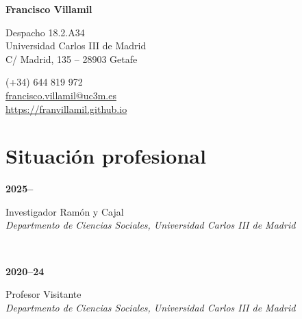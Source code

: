 \documentclass[a4paper, 12pt]{article}
\begin{document}

\begin{center}
{\bfseries\Large Francisco Villamil}
\end{center}

\vspace{0pt}

\noindent
\begin{minipage}[t]{0.47\textwidth}\small
\flushright
	Despacho 18.2.A34\\
	Universidad Carlos III de Madrid\\
	C/ Madrid, 135 -- 28903 Getafe\\
\end{minipage}\hfill
\begin{minipage}[t]{0.47\textwidth}\small
	 \hspace{5pt} (+34) 644 819 972\\
	 \hspace{5pt} \href{mailto:francisco.villamil@uc3m.es}{francisco.villamil@uc3m.es}\\
	 \hspace{5pt} \href{https://franvillamil.github.io}{https://franvillamil.github.io}\\
\end{minipage}


\section*{Situación profesional}

\noindent
\begin{minipage}[t]{0.12\textwidth}
\textbf{2025--}
\end{minipage}\hfill\begin{minipage}[t]{0.88\textwidth}
Investigador Ramón y Cajal\\
\textit{Departmento de Ciencias Sociales, Universidad Carlos III de Madrid}\\\vspace{-8pt}
\end{minipage}\\
\begin{minipage}[t]{0.12\textwidth}
\textbf{2020--24}
\end{minipage}\hfill\begin{minipage}[t]{0.88\textwidth}
Profesor Visitante\\
\textit{Departmento de Ciencias Sociales, Universidad Carlos III de Madrid}\\\vspace{-8pt}
\end{minipage}\\
\end{document}
